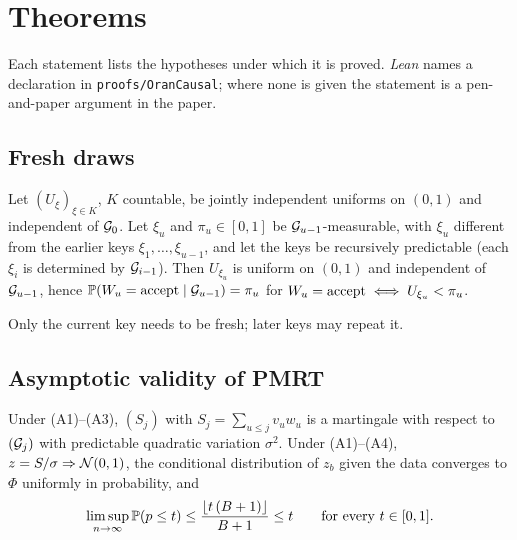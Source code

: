 \section{Theorems}
\label{spec:thm}

Each statement lists the hypotheses under which it is proved. \emph{Lean} names a declaration in \texttt{proofs/OranCausal}; where none is given the statement is a pen-and-paper argument in the paper.

\subsection{Fresh draws}
\label{spec:thm.fresh}

\begin{lemma}
Let $(U_\xi)_{\xi \in K}$, $K$ countable, be jointly independent uniforms on $(0,1)$ and independent of $\mathcal{G}_{0}$. Let $\xi_u$ and $\pi_u \in [0,1]$ be $\mathcal{G}_{u-1}$-measurable, with $\xi_u$ different from the earlier keys $\xi_1, \dots, \xi_{u-1}$, and let the keys be recursively predictable (each $\xi_i$ is determined by $\mathcal{G}_{i-1}$). Then $U_{\xi_u}$ is uniform on $(0,1)$ and independent of $\mathcal{G}_{u-1}$, hence $\mathbb{P}(W_u = \text{accept} \mid \mathcal{G}_{u-1}) = \pi_u$ for $W_u = \text{accept} \iff U_{\xi_u} < \pi_u$.
\end{lemma}

\noindent Only the current key needs to be fresh; later keys may repeat it.


\subsection{Asymptotic validity of PMRT}
\label{spec:thm.pmrt}

\begin{proposition}
Under (A1)--(A3), $(S_j)$ with $S_j = \sum_{u \le j} v_u w_u$ is a martingale with respect to $(\mathcal{G}_{j})$ with predictable quadratic variation $\sigma^2$. Under (A1)--(A4), $z = S/\sigma \Rightarrow \mathcal{N}(0,1)$, the conditional distribution of $z_b$ given the data converges to $\Phi$ uniformly in probability, and
\begin{equation*}
\limsup_{n \to \infty} \mathbb{P}(p \le t) \le \frac{\lfloor t\,(B + 1)\rfloor}{B + 1} \le t \qquad \text{for every } t \in [0,1].
\end{equation*}
\end{proposition}

